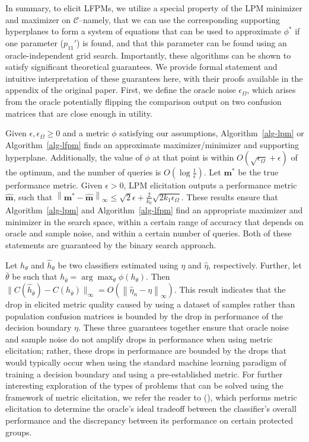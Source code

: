 \documentclass[
  letterpaper,
  numbers=noenddot,
  DIV=11]{scrreprt}
\theoremstyle{plain}
\theoremstyle{definition}
\theoremstyle{remark}
\begin{document}
In summary, to elicit LFPMs, we utilize a special property of the LPM
minimizer and maximizer on \(\mathcal{C}\)--namely, that we can use the
corresponding supporting hyperplanes to form a system of equations that
can be used to approximate \(\phi^*\) if one parameter (\(p_{11}'\)) is
found, and that this parameter can be found using an oracle-independent
grid search. Importantly, these algorithms can be shown to satisfy
significant theoretical guarantees. We provide formal statement and
intuitive interpretation of these guarantees here, with their proofs
available in the appendix of the original paper. First, we define the
oracle noise \(\epsilon_{\Omega}\), which arises from the oracle
potentially flipping the comparison output on two confusion matrices
that are close enough in utility.

Given \(\epsilon, \epsilon_{\Omega} \geq 0\) and a metric \(\phi\)
satisfying our assumptions,  Algorithm~\ref{alg-lpm}  or
 Algorithm~\ref{alg-lfpm}  finds an approximate maximizer/minimizer and
supporting hyperplane. Additionally, the value of \(\phi\) at that point
is within \(O\left(\sqrt{\epsilon_{\Omega}} + \epsilon\right)\) of the
optimum, and the number of queries is
\(O\left(\log \frac{1}{\epsilon}\right)\). Let \(\mathbf{m}^{*}\) be the
true performance metric. Given \(\epsilon > 0\), LPM elicitation outputs
a performance metric \(\hat{\mathbf{m}}\), such that
\(\left\|\mathbf{m}^{*} - \hat{\mathbf{m}}\right\|_{\infty} \leq \sqrt{2} \epsilon + \frac{2}{k_{0}} \sqrt{2 k_{1} \epsilon_{\Omega}}\).
These results ensure that  Algorithm~\ref{alg-lpm}  and
 Algorithm~\ref{alg-lfpm}  find an appropriate maximizer and minimizer
in the search space, within a certain range of accuracy that depends on
oracle and sample noise, and within a certain number of queries. Both of
these statements are guaranteed by the binary search approach.

Let \(h_{\theta}\) and \(\hat{h}_{\theta}\) be two classifiers estimated
using \(\eta\) and \(\hat{\eta}\), respectively. Further, let
\(\bar{\theta}\) be such that
\(h_{\bar{\theta}} = \arg \max _{\theta} \phi\left(h_{\theta}\right)\).
Then
\(\|C(\hat{h}_{\bar{\theta}}) - C\left(h_{\bar{\theta}}\right)\|_{\infty} = O\left(\left\|\hat{\eta}_{n} - \eta\right\|_{\infty}\right)\).
This result indicates that the drop in elicited metric quality caused by
using a dataset of samples rather than population confusion matrices is
bounded by the drop in performance of the decision boundary \(\eta\).
These three guarantees together ensure that oracle noise and sample
noise do not amplify drops in performance when using metric elicitation;
rather, these drops in performance are bounded by the drops that would
typically occur when using the standard machine learning paradigm of
training a decision boundary and using a pre-established metric. For
further interesting exploration of the types of problems that can be
solved using the framework of metric elicitation, we refer the reader to
(), which
performs metric elicitation to determine the oracle's ideal tradeoff
between the classifier's overall performance and the discrepancy between
its performance on certain protected groups.
\end{document}
